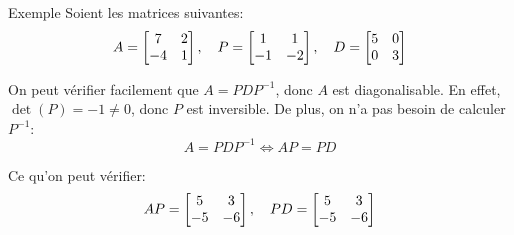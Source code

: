 \documentclass[a4paper]{article}
\begin{document}
\begin{parag}{Exemple}
    Soient les matrices suivantes: 
    \[A = \begin{bmatrix} 7 & 2 \\ -4 & 1 \end{bmatrix}, \quad P = \begin{bmatrix} 1 & 1 \\ -1 & -2 \end{bmatrix}, \quad D = \begin{bmatrix} 5 & 0 \\ 0 & 3 \end{bmatrix} \]

    On peut vérifier facilement que $A = PDP^{-1}$, donc $A$ est diagonalisable. En effet, $\det\left(P\right) = -1 \neq 0$, donc $P$ est inversible. De plus, on n'a pas besoin de calculer $P^{-1}$:
    \[A = PDP^{-1} \iff AP = PD\]
    
    Ce qu'on peut vérifier: 
    \[AP = \begin{bmatrix} 5 & 3 \\ -5 & -6 \end{bmatrix}, \quad PD = \begin{bmatrix} 5 & 3 \\ -5 & -6 \end{bmatrix} \]
    
    
\end{parag}
\end{document}
